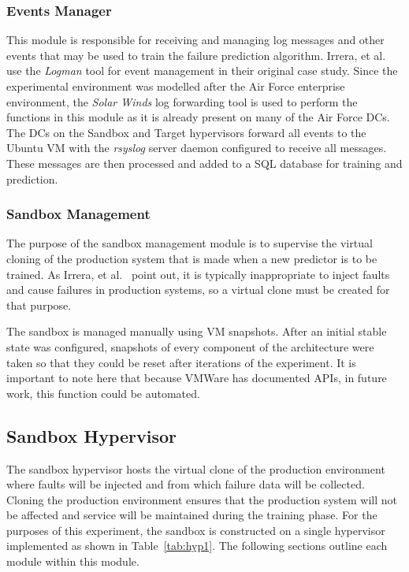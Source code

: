 \subsubsection{Events Manager} \label{sec:eventsManagerMgr}
This module is responsible for receiving and managing log messages and other
events that may be used to train the failure prediction algorithm.  Irrera, et
al.~\cite{irrera2015} use the \emph{Logman} tool for event management in their
original case study.  Since the experimental environment was modelled after the
Air Force enterprise environment, the \emph{Solar Winds} log forwarding tool is
used to perform the functions in this module as it is already present on many
of the Air Force \ac{DC}s.  The \ac{DC}s on the Sandbox and Target hypervisors
forward all events to the Ubuntu \ac{VM} with the \emph{rsyslog} server daemon
configured to receive all messages.  These messages are then processed and
added to a \ac{SQL} database for training and prediction.  

\subsubsection{Sandbox Management} \label{sec:sandboxMgr} 
The purpose of the sandbox management module is to supervise the virtual
cloning of the production system that is made when a new predictor is to be
trained.  As Irrera, et al.~\cite{irrera2015,irrera2013} point out, it is
typically inappropriate to inject faults and cause failures in production
systems, so a virtual clone must be created for that purpose.

The sandbox is managed manually using \ac{VM} snapshots.  After an initial
stable state was configured, snapshots of every component of the architecture
were taken so that they could be reset after iterations of the experiment.  It
is important to note here that because VMWare has documented \ac{API}s, in
future work, this function could be automated.

\subsection{Sandbox Hypervisor} \label{sec:sandbox}
The sandbox hypervisor hosts the virtual clone of the production environment
where faults will be injected and from which failure data will be collected.
Cloning the production environment ensures that the production system will not
be affected and service will be maintained during the training phase.  For the
purposes of this experiment, the sandbox is constructed on a single hypervisor
implemented as shown in Table~\ref{tab:hyp1}.  The following sections outline
each module within this module.

